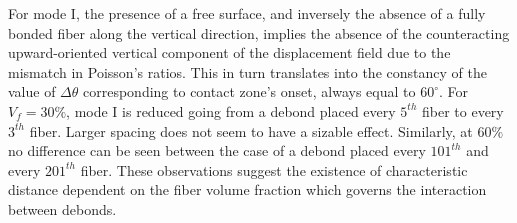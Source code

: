 \documentclass[review]{elsarticle}
\begin{document}
For mode I, the presence of a free surface, and inversely the absence of a fully bonded fiber along the vertical direction, implies the absence of the counteracting upward-oriented vertical component of the displacement field due to the mismatch in Poisson's ratios. This in turn translates into the constancy of the value of $\Delta\theta$ corresponding to contact zone's onset, always equal to $60^{\circ}$. For $V_{f}=30\%$, mode I is reduced going from a debond placed every $5^{th}$ fiber to every $3^{th}$ fiber. Larger spacing does not seem to have a sizable effect. Similarly, at $60\%$ no difference can be seen between the case of a debond placed every $101^{th}$ and every $201^{th}$ fiber. These observations suggest the existence of characteristic distance dependent on the fiber volume fraction which governs the interaction between debonds.
\end{document}
